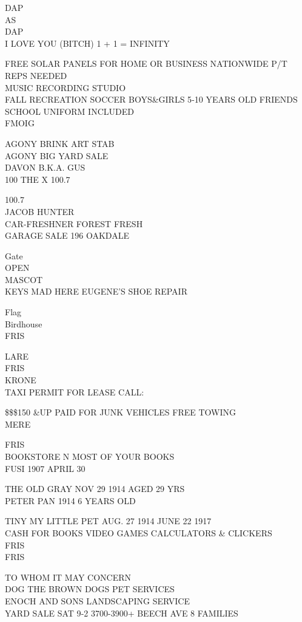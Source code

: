 \documentclass[10pt,letterpaper]{article}
\begin{document}
DAP\\
AS\\
DAP\\
I LOVE YOU (BITCH) 1 + 1 = INFINITY

FREE SOLAR PANELS FOR HOME OR BUSINESS NATIONWIDE P/T REPS NEEDED\\
MUSIC RECORDING STUDIO\\
FALL RECREATION SOCCER BOYS\&GIRLS 5{-}10 YEARS OLD FRIENDS SCHOOL UNIFORM INCLUDED\\
FMOIG

AGONY BRINK ART STAB\\
AGONY BIG YARD SALE\\
DAVON B.K.A. GUS\\
100 THE X 100.7

100.7\\
JACOB HUNTER\\
CAR{-}FRESHNER FOREST FRESH\\
GARAGE SALE 196 OAKDALE

Gate\\
OPEN\\
MASCOT\\
KEYS MAD HERE EUGENE'S SHOE REPAIR

Flag\\
Birdhouse\\
FRIS

LARE\\
FRIS\\
KRONE\\
TAXI PERMIT FOR LEASE CALL:

\$\$\$150 \&UP PAID FOR JUNK VEHICLES FREE TOWING\\
MERE

FRIS\\
BOOKSTORE N MOST OF YOUR BOOKS\\
FUSI 1907 APRIL 30

THE OLD GRAY NOV 29 1914 AGED 29 YRS\\
PETER PAN 1914 6 YEARS OLD

TINY MY LITTLE PET AUG. 27 1914 JUNE 22 1917\\
CASH FOR BOOKS VIDEO GAMES CALCULATORS \& CLICKERS\\
FRIS\\
FRIS

TO WHOM IT MAY CONCERN\\
DOG THE BROWN DOGS PET SERVICES\\
ENOCH AND SONS LANDSCAPING SERVICE\\
YARD SALE SAT 9{-}2 3700{-}3900+ BEECH AVE 8 FAMILIES
\end{document}

